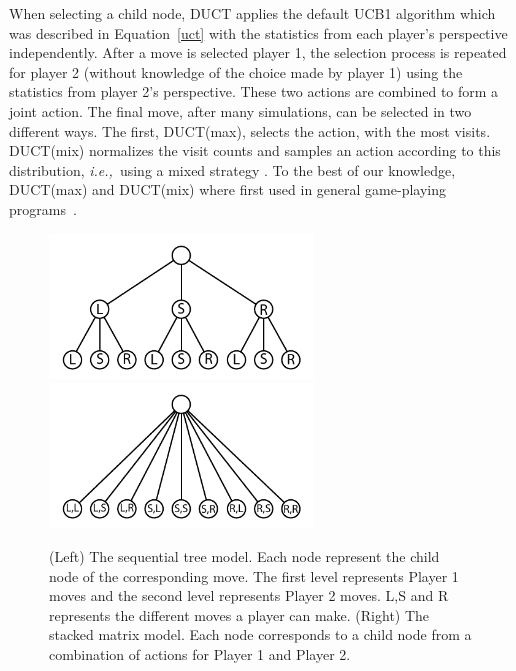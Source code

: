 \documentclass{article}
\newcommand{\ie}{{\it i.e.,}~}
\begin{document}
When selecting a child node, DUCT applies the default UCB1 algorithm which was described in Equation~\ref{uct} with the statistics from each player's perspective independently. After a move is selected player 1, the selection process is repeated for player 2 (without knowledge of the choice made by player 1) using the statistics from player 2's perspective. These two actions are combined to form a joint action.
The final move, after many simulations, can be selected in two different ways. The first, DUCT(max), selects the action, with the most visits. 
DUCT(mix) normalizes the visit counts and samples an action according to this distribution, \ie using a mixed strategy \cite{mcts_goofspiel}. 
To the best of our knowledge, DUCT(max) and DUCT(mix) where first used in general game-playing programs~\cite{finnson_master,Shafiei09}.

\begin{figure}
\begin{center}
\includegraphics[width=7cm]{images/graph_seq_uct.pdf} \includegraphics[width=7cm]{images/graph_dec_uct.pdf}
\caption{(Left) The sequential tree model. Each node represent the child node of the corresponding move. The first level represents Player 1 moves and the second level represents Player 2 moves. 
L,S and R represents the different moves a player can make. 
(Right) The stacked matrix model. Each node corresponds to a child node from a combination of actions for Player 1 and Player 2. 
\label{fig:suct_vs_duct}}
\end{center}
\end{figure}
\end{document}
